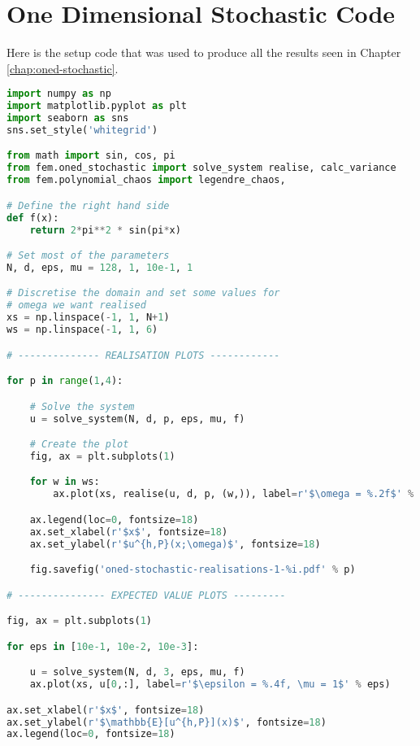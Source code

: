 \chapter{One Dimensional Stochastic Code}\label{app:oned-stochastic-code}

Here is the setup code that was used to produce all the results seen in Chapter
\ref{chap:oned-stochastic}.
\begin{lstlisting}[language=Python,
                   caption={Setup code used to obtain results for Chapter
                   \ref{chap:oned-stochastic}},
                   label={code:oned-stochastic-setup}]
import numpy as np
import matplotlib.pyplot as plt
import seaborn as sns
sns.set_style('whitegrid')

from math import sin, cos, pi
from fem.oned_stochastic import solve_system realise, calc_variance
from fem.polynomial_chaos import legendre_chaos,

# Define the right hand side
def f(x):
    return 2*pi**2 * sin(pi*x)

# Set most of the parameters
N, d, eps, mu = 128, 1, 10e-1, 1

# Discretise the domain and set some values for
# omega we want realised
xs = np.linspace(-1, 1, N+1)
ws = np.linspace(-1, 1, 6)

# -------------- REALISATION PLOTS ------------

for p in range(1,4):

    # Solve the system
    u = solve_system(N, d, p, eps, mu, f)

    # Create the plot
    fig, ax = plt.subplots(1)

    for w in ws:
        ax.plot(xs, realise(u, d, p, (w,)), label=r'$\omega = %.2f$' % w)

    ax.legend(loc=0, fontsize=18)
    ax.set_xlabel(r'$x$', fontsize=18)
    ax.set_ylabel(r'$u^{h,P}(x;\omega)$', fontsize=18)

    fig.savefig('oned-stochastic-realisations-1-%i.pdf' % p)

# --------------- EXPECTED VALUE PLOTS ---------

fig, ax = plt.subplots(1)

for eps in [10e-1, 10e-2, 10e-3]:

    u = solve_system(N, d, 3, eps, mu, f)
    ax.plot(xs, u[0,:], label=r'$\epsilon = %.4f, \mu = 1$' % eps)

ax.set_xlabel(r'$x$', fontsize=18)
ax.set_ylabel(r'$\mathbb{E}[u^{h,P}](x)$', fontsize=18)
ax.legend(loc=0, fontsize=18)


\end{lstlisting}
